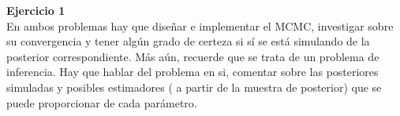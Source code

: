 \documentclass[a4paper, 11pt]{article}
\newenvironment{problem}[2][Ejercicio]
{ \begin{mdframed}[backgroundcolor= red!50] \textbf{#1 #2} \\}
	{  \end{mdframed}}
\begin{document}
	\setlength{\parskip}{\medskipamount}
	\setlength{\parindent}{0pt}

\begin{problem}{1} 
    En ambos problemas hay que diseñar e implementar el MCMC, investigar sobre su convergencia y tener algún grado de certeza si sí se está simulando de la posterior correspondiente. Más aún, recuerde que se trata de un problema de inferencia. Hay que hablar del problema en si, comentar sobre las posteriores simuladas y posibles estimadores ( a partir de la muestra de posterior) que se puede proporcionar de cada parámetro.
\end{problem}
\end{document}
